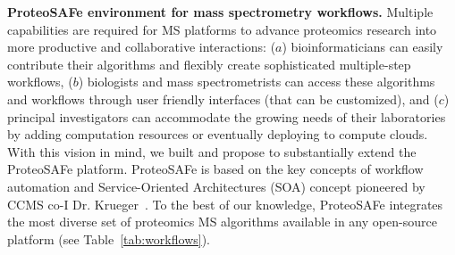 \documentclass[arial,11pt]{article}
\newcommand{\SF}[1]{\textsf{#1}}
\newcommand{\SYSTEM}[0]{\SF{ProteoSAFe}\xspace}
\begin{document}
{\bf ProteoSAFe environment for mass spectrometry workflows.} Multiple capabilities are required for MS platforms to advance proteomics research into more productive and collaborative  interactions: ($a$) bioinformaticians can easily contribute their algorithms and flexibly create sophisticated multiple-step workflows, ($b$) biologists and mass spectrometrists can access these algorithms and workflows through user friendly  interfaces (that can be customized), and ($c$) principal investigators can accommodate the growing needs of their laboratories by adding computation resources or eventually deploying to compute clouds.
%
With this vision in mind, we built and propose to substantially extend the \SYSTEM platform.
%
\SYSTEM is based on the key concepts of workflow automation and Service-Oriented Architectures (SOA) concept pioneered by CCMS co-I Dr. Krueger~\cite{Arrott:2007,Ermagan:2007}. To the best of our knowledge, \SYSTEM integrates the most diverse set of proteomics MS  algorithms available in any open-source platform (see Table~\ref{tab:workflows}).
\end{document}
